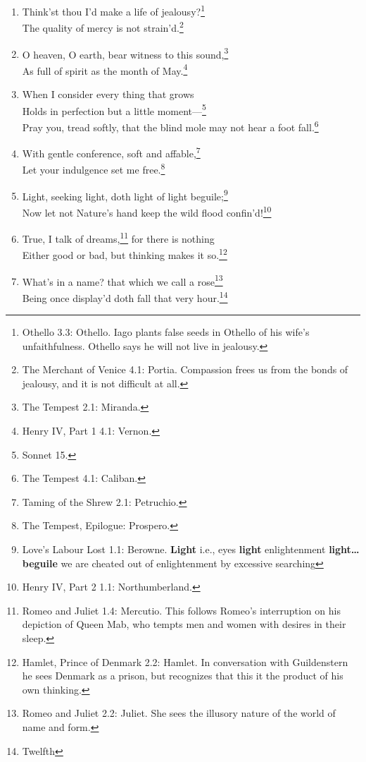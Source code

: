 \documentclass[17pt,twoside]{extarticle}
\begin{document}
\begin{enumerate}
{    faithfulness, tries to intervene.}
\item
  Think'st thou I'd make a life of jealousy?\footnote{Othello 3.3:
    Othello. Iago plants false seeds in Othello of his wife's
    unfaithfulness. Othello says he will not live in jealousy.}\\The
  quality of mercy is not strain'd.\footnote{The Merchant of Venice 4.1:
    Portia. Compassion frees us from the bonds of jealousy, and it is
    not difficult at all.}
\item
  O heaven, O earth, bear witness to this sound,\footnote{The Tempest
    2.1: Miranda.}\\As full of spirit as the month of May.\footnote{Henry
    IV, Part 1 4.1: Vernon.}
\item
  When I consider every thing that grows\\Holds in perfection but a
  little moment---\footnote{Sonnet 15.}\\Pray you, tread softly, that
  the blind mole may not hear a foot fall.\footnote{The Tempest 4.1:
    Caliban.}
\item
  With gentle conference, soft and affable,\footnote{Taming of the Shrew
    2.1: Petruchio.}\\Let your indulgence set me free.\footnote{The
    Tempest, Epilogue: Prospero.}
\item
  Light, seeking light, doth light of light beguile;\footnote{Love's
    Labour Lost 1.1: Berowne. \textbf{Light} i.e., eyes \textbf{light}
    enlightenment \textbf{light\ldots{}beguile} we are cheated out of
    enlightenment by excessive searching}\\Now let not Nature's hand
  keep the wild flood confin'd!\footnote{Henry IV, Part 2 1.1:
    Northumberland.}
\item
  True, I talk of dreams,\footnote{Romeo and Juliet 1.4: Mercutio. This
    follows Romeo's interruption on his depiction of Queen Mab, who
    tempts men and women with desires in their sleep.} for there is
  nothing\\Either good or bad, but thinking makes it so.\footnote{Hamlet,
    Prince of Denmark 2.2: Hamlet. In conversation with Guildenstern he
    sees Denmark as a prison, but recognizes that this it the product of
    his own thinking.}
\item
  What's in a name? that which we call a rose\footnote{Romeo and Juliet
    2.2: Juliet. She sees the illusory nature of the world of name and
    form.}\\Being once display'd doth fall that very hour.\footnote{Twelfth
}
\end{enumerate}
\end{document}
